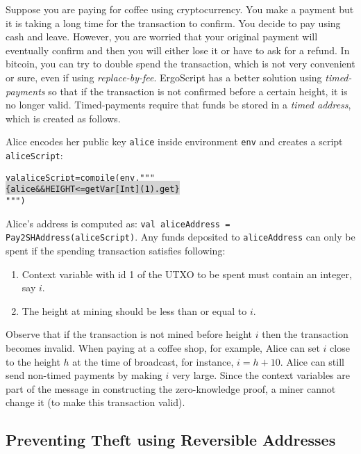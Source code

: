 \documentclass[11pt]{article}
\newcommand\Hi[2][lightgray]{%
	\hspace*{-\fboxsep}%
	\colorbox{#1}{#2}%
	\hspace*{-\fboxsep}%
}
\newcommand{\langname}{ErgoScript\xspace}
\begin{document}
Suppose you are paying for coffee using cryptocurrency. You make a payment but it is taking a long time for the transaction to confirm. You decide to pay using cash and leave. However, you are worried that your original payment will eventually confirm and then you will either lose it or have to ask for a refund. In bitcoin, you can try to double spend the transaction, which is not very convenient or sure, even if using {\em replace-by-fee}. \langname has a better solution using {\em timed-payments} so that if the transaction is not confirmed before a certain height, it is no longer valid. Timed-payments require that funds be stored in a {\em timed address}, which is created as follows. 

Alice encodes her public key \texttt{alice} inside environment \texttt{env} and creates a script \texttt{aliceScript}:
\begin{alltt}
	val aliceScript = compile(env, """ \Hi{\{alice && HEIGHT <= getVar[Int](1).get\}}""")
\end{alltt}

Alice's address is computed as: \texttt{val aliceAddress = Pay2SHAddress(aliceScript)}. Any funds deposited to \texttt{aliceAddress} can only be spent if the spending transaction satisfies following:
\begin{enumerate}
	\item Context variable with id 1 of the UTXO to be spent must contain an integer, say $i$.
	\item The height at mining should be less than or equal to $i$. 
\end{enumerate}

Observe that if the transaction is not mined before height $i$ then the transaction becomes invalid. When paying at a coffee shop, for example, Alice can set $i$ close to the height $h$ at the time of broadcast, for instance, $i = h + 10$. 
Alice can still send non-timed payments by making $i$ very large. Since the context variables are part of the message in constructing the zero-knowledge proof, a miner cannot change it (to make this transaction valid). 

\subsection{Preventing Theft using Reversible Addresses}
\end{document}
